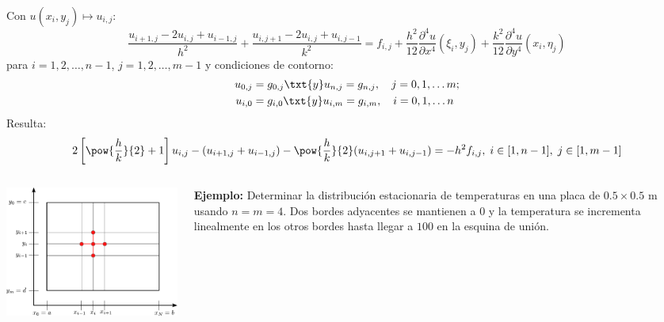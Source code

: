 \documentclass[9pt, aspectratio=169]{beamer}
\begin{document}
\begin{frame}
    Con $u(x_i, y_j) \mapsto u_{i,j}$:
    \[ \frac{u_{i+1, j} - 2 u_{i,j} + u_{i-1, j}}{h^2} + \frac{u_{i, j+1} - 2 u_{i,j} + u_{i, j-1}}{k^2} = f_{i, j} + \frac{h^2}{12} \frac{\partial^4 u}{\partial x^4}(\xi_i, y_j) + \frac{k^2}{12} \frac{\partial^4 u}{\partial y^4}(x_i, \eta_j) \]
    para $i = 1, 2, \ldots, n-1$, $j = 1, 2, \ldots, m-1$ y condiciones de contorno:
\begin{align*}
    u_{0, j} &= g_{0, j} \txt{y} u_{n, j} = g_{n, j}, \quad j = 0, 1, \ldots m; \\
    u_{i, 0} &= g_{i, 0} \txt{y} u_{i, m} = g_{i, m}, \quad i = 0, 1, \ldots n
\end{align*}
Resulta:
\[ 2 \left[ \pow{\frac{h}{k}}{2} + 1 \right]  u_{i,j} - (u_{i+1, j} + u_{i-1,j}) - \pow{\frac{h}{k}}{2} (u_{i, j+1} + u_{i, j-1}) = -h^2 f_{i,j}, \; i \in [1, n-1], \; j \in [1, m-1] \]
\begin{columns}
\cx
    \begin{center}
        \includegraphics[scale=0.53]{figs/malla-02.pdf}
    \end{center}
\cx
\vspace{1em} \pause

\textbf{Ejemplo:} Determinar la distribución estacionaria de temperaturas en una placa de $0.5 \times 0.5$ m usando $n = m = 4$. Dos bordes adyacentes se mantienen a $0$ \textcelsius{} y la temperatura se incrementa linealmente en los otros bordes hasta llegar a $100$ \textcelsius{} en la esquina de unión.
\end{columns}
\end{frame}
\end{document}
